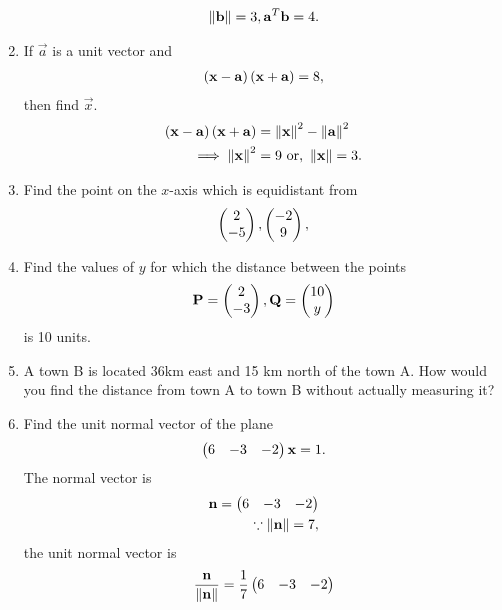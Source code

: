 \documentclass[journal,12pt,twocolumn]{IEEEtran}
\renewcommand\thesection{\arabic{section}}
\begin{document}
\begin{enumerate}[label=\thesection.\arabic*.,ref=\thesection.\theenumi]
\begin{align}
\left\lVert\mathbf{b}\right\rVert = 3,
\mathbf{a}^T\mathbf{b} = 4.
\end{align}
%
\solution 
%
%
%
\item If $\vec{a}$ is a unit vector and 
%
\begin{align}
\left(\mathbf{x}-\mathbf{a}\right)\left(\mathbf{x}+\mathbf{a}\right) = 8, 
\end{align}
%
then find $\vec{x}$.
%
\\
\solution 
%
\begin{align}
\left(\mathbf{x}-\mathbf{a}\right)\left(\mathbf{x}+\mathbf{a}\right) &= \left\lVert\mathbf{x}\right\rVert^2-\left\lVert\mathbf{a}\right\rVert^2
\\
\implies \left\lVert\mathbf{x}\right\rVert^2 &= 9 \text{ or, } \left\lVert\mathbf{x}\right\rVert = 3.
\end{align}
%
\item Find the point on the $x$-axis which is equidistant from 
\begin{align}
\begin{pmatrix}2\\-5\end{pmatrix}, \begin{pmatrix}-2\\9\end{pmatrix},
\end{align}
\solution
\item Find the values of $y$ for which the distance between the points 
\begin{align}
\mathbf{P} = \begin{pmatrix}2\\-3\end{pmatrix}, \mathbf{Q} = \begin{pmatrix}10\\y\end{pmatrix}
\end{align}
is 10 units.
\solution
\item A town B is located 36km east and 15 km north of the town A.  How would you find the distance from town A to town B without actually measuring it?
\\
\solution
\item Find the unit normal vector of the plane 
\begin{align}
\begin{pmatrix}6 & -3 & -2\end{pmatrix}\mathbf{x}  = 1.
\end{align}
%
\solution The normal vector is 
%
\begin{align}
\mathbf{n} = \begin{pmatrix}6 & -3 & -2\end{pmatrix}
\\
\because \left\lVert\mathbf{n}\right\rVert = 7,
\end{align}
%
the unit normal vector is 
%
\begin{align}
\frac{\mathbf{n}}{\left\lVert\mathbf{n}\right\rVert} = \frac{1}{7}\begin{pmatrix}6 & -3 & -2\end{pmatrix}
\end{align}
%
%


\end{enumerate}
\end{document}
